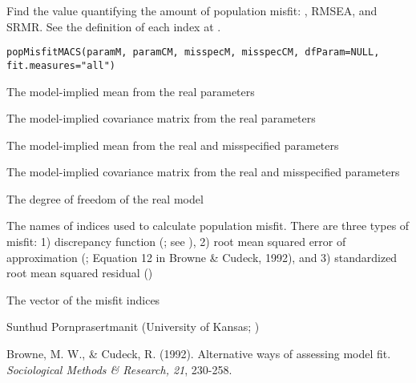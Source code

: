 \documentclass[a4paper]{book}
\begin{document}
%
\begin{Description}\relax
Find the value quantifying the amount of population misfit: , RMSEA, and SRMR. See the definition of each index at .
\end{Description}
%
\begin{Usage}
\begin{verbatim}
popMisfitMACS(paramM, paramCM, misspecM, misspecCM, dfParam=NULL, fit.measures="all")
\end{verbatim}
\end{Usage}
%
\begin{Arguments}
\begin{ldescription}
\item[\code{paramM}] 
The model-implied mean from the real parameters

\item[\code{paramCM}] 
The model-implied covariance matrix from the real parameters

\item[\code{misspecM}] 
The model-implied mean from the real and misspecified parameters

\item[\code{misspecCM}] 
The model-implied covariance matrix from the real and misspecified parameters

\item[\code{dfParam}] 
The degree of freedom of the real model

\item[\code{fit.measures}] 
The names of indices used to calculate population misfit. There are three types of misfit: 1) discrepancy function (; see ), 2) root mean squared error of approximation (; Equation 12 in Browne \& Cudeck, 1992), and 3) standardized root mean squared residual ()

\end{ldescription}
\end{Arguments}
%
\begin{Value}
The vector of the misfit indices
\end{Value}
%
\begin{Author}\relax
Sunthud Pornprasertmanit (University of Kansas; )
\end{Author}
%
\begin{References}\relax
Browne, M. W., \& Cudeck, R. (1992). Alternative ways of assessing model fit. \emph{Sociological Methods \& Research, 21}, 230-258.
\end{References}
\end{document}
